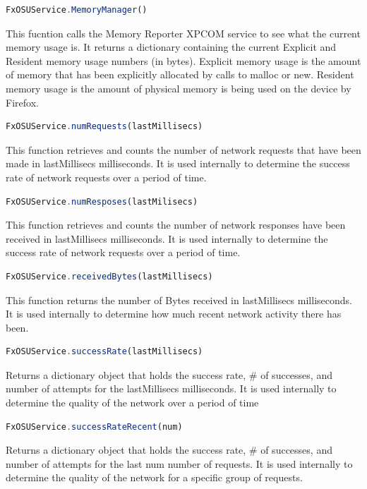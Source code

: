 \documentclass[12pt]{article}
\begin{document}
\begin{itemize}
\begin{lstlisting}[language=JavaScript]
FxOSUService.MemoryManager()
\end{lstlisting} 
This fucntion calls the Memory Reporter XPCOM service to see what the current memory usage is.  It returns a dictionary containing the current Explicit and Resident memory usage numbers (in bytes).  Explicit memory usage is the amount of memory that has been explicitly allocated by calls to malloc or new.  Resident memory usage is the amount of physical memory is being used on the device by Firefox.  \\
\begin{lstlisting}[language=JavaScript]
FxOSUService.numRequests(lastMillisecs)
\end{lstlisting}  
This function retrieves and counts the number of network requests that have been made in lastMillisecs milliseconds.  It is used internally to determine the success rate of network requests over a period of time.  
\begin{lstlisting}[language=JavaScript]
FxOSUService.numResposes(lastMilisecs)
\end{lstlisting} 
This function retrieves and counts the number of network responses have been received in lastMillisecs
milliseconds.  It is used internally to determine the success rate of network requests over a period of time.
\begin{lstlisting}[language=JavaScript]
FxOSUService.receivedBytes(lastMillisecs)
\end{lstlisting}
This function returns the number of Bytes received in lastMillisecs milliseconds.  It is used internally to determine how much recent network activity there has been.  
\begin{lstlisting}[language=JavaScript]
FxOSUService.successRate(lastMillisecs)
\end{lstlisting}
Returns a dictionary object that holds the success rate, \# of successes, and number of attempts for the lastMillisecs milliseconds.  It is used internally to determine the quality of the network over a period of time
\begin{lstlisting}[language=JavaScript]
FxOSUService.successRateRecent(num)
\end{lstlisting}
Returns a dictionary object that holds the success rate, \# of successes, and number of attempts for the last num number of requests. It is used internally to determine the quality of the network for a specific group of requests.
\begin{lstlisting}[language=JavaScript]

\end{lstlisting}
\end{itemize}
\end{document}
